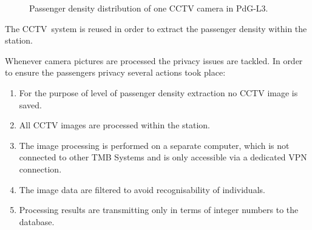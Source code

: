 \begin{figure}[htb]

  \centering

  \hfill

  \caption{Passenger density distribution of one CCTV camera in PdG-L3.}
  \label{fig:PdG-L3_CCTVcameras}

\end{figure}


The CCTV~system is reused in order to extract the passenger density within the station.

Whenever camera pictures are processed the privacy issues are tackled. In order to ensure the passengers privacy several actions took place:
\begin{enumerate}
  \item For the purpose of level of passenger density extraction no CCTV image is saved.
  \item All CCTV images are processed within the station.
  \item The image processing is performed on a separate computer, which is not connected to other TMB Systems and is only accessible via a dedicated VPN connection.
  \item The image data are filtered to avoid recognisability of individuals.
  \item Processing results are transmitting only in terms of integer numbers to the database.
\end{enumerate}

